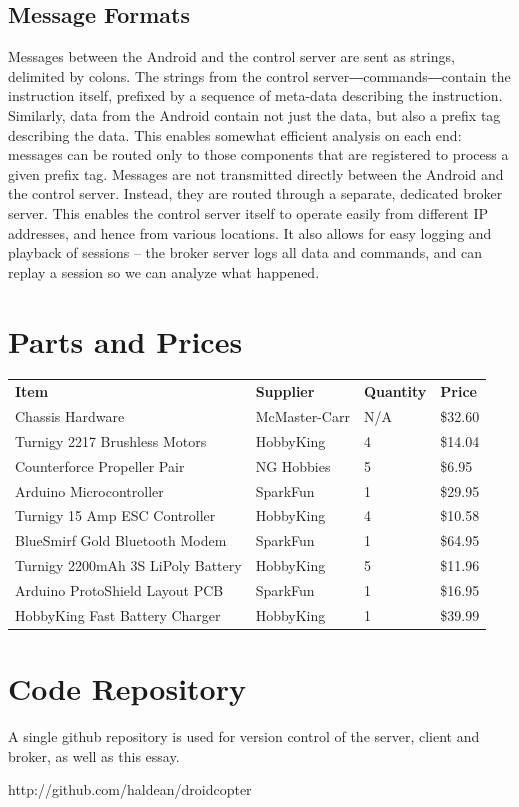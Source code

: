 \documentclass[letterpaper]{article}
\begin{document}
\subsection{Message Formats}
\label{sec:msgs}
‏Messages between the Android and the control server are sent as
strings,‭ ‬delimited by colons.‭ ‬The strings from the control
server―commands―contain the instruction itself,‭ ‬prefixed by a sequence
of meta-data describing the instruction.‭ ‬Similarly,‭ ‬data from the
Android contain not just the data,‭ ‬but also a prefix tag describing
the data.‭ ‬This enables somewhat efficient analysis on each end:‭
‬messages can be routed only to those components that are registered to
process a given prefix tag.  Messages are not transmitted directly
between the Android and the control server.‭ ‬Instead,‭ ‬they are routed
through a separate,‭ ‬dedicated broker server.‭ ‬This enables the control
server itself to operate easily from different IP addresses,‭ ‬and hence
from various locations. It also allows for easy logging and playback
of sessions -- the broker server logs all data and commands, and can
replay a session so we can analyze what happened.

\newpage
\appendix
\section{Parts and Prices}
\label{tab:parts}
\begin{tabular}{llll}
  \textbf{Item} & \textbf{Supplier}
  & \textbf{Quantity} & \textbf{Price} \\

  Chassis Hardware & McMaster-Carr & N/A & \$32.60 \\
  Turnigy 2217 Brushless Motors & HobbyKing & 4 & \$14.04 \\
  Counterforce Propeller Pair & NG Hobbies & 5 & \$6.95 \\
  Arduino Microcontroller & SparkFun & 1 & \$29.95 \\
  Turnigy 15 Amp ESC Controller & HobbyKing & 4 & \$10.58 \\
  BlueSmirf Gold Bluetooth Modem & SparkFun & 1 & \$64.95 \\
  Turnigy 2200mAh 3S LiPoly Battery & HobbyKing & 5 & \$11.96 \\
  Arduino ProtoShield Layout PCB & SparkFun & 1 & \$16.95 \\
  HobbyKing Fast Battery Charger & HobbyKing & 1 & \$39.99 \\
\end{tabular}

\section{Code Repository}
A single github repository is used for version control of the server,
client and broker, as well as this essay.

http://github.com/haldean/droidcopter
\end{document}
